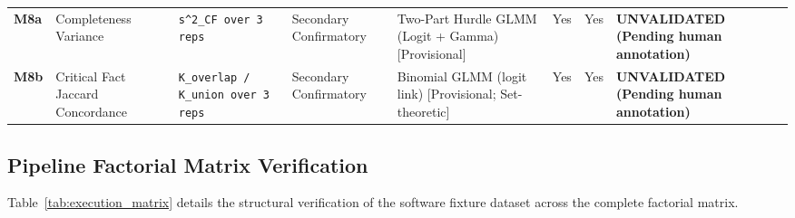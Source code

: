 \documentclass[11pt,a4paper]{article}
\begin{document}
\begin{longtable}{p{1.0cm} p{2.2cm} p{3.2cm} p{1.8cm} p{2.8cm} c c p{2.2cm}}
\addlinespace
\textbf{M8a} & Completeness Variance & \texttt{s\textasciicircum 2\_CF over 3 reps} & Secondary Confirmatory & Two-Part Hurdle GLMM (Logit + Gamma) [Provisional] & Yes & Yes & \textbf{UNVALIDATED (Pending human annotation)} \\
\addlinespace
\textbf{M8b} & Critical Fact Jaccard Concordance & \texttt{K\_overlap / K\_union over 3 reps} & Secondary Confirmatory & Binomial GLMM (logit link) [Provisional; Set-theoretic] & Yes & Yes & \textbf{UNVALIDATED (Pending human annotation)} \\
\end{longtable}

\subsection{Pipeline Factorial Matrix Verification}
\label{sec:pipeline_verification}

Table~\ref{tab:execution_matrix} details the structural verification of the software fixture dataset across the complete factorial matrix.
\end{document}
